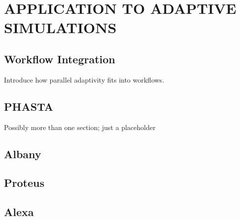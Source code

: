 
\chapter{APPLICATION TO ADAPTIVE SIMULATIONS}
\label{chap:apps}

\section{Workflow Integration}

Introduce how parallel adaptivity fits into workflows.

\section{PHASTA}

Possibly more than one section; just a placeholder

\section{Albany}

\section{Proteus}

\section{Alexa}

